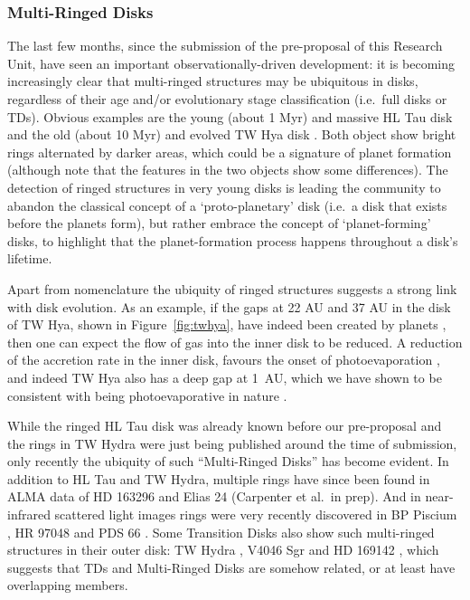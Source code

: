 \documentclass[10pt,fleqn,twoside]{article}
\begin{document}
\subsubsection{Multi-Ringed Disks}
\label{sec-multi-ringed-disks}
The last few months, since the submission of the pre-proposal of this
Research Unit, have seen an important observationally-driven development: it
is becoming increasingly clear that multi-ringed structures may be
ubiquitous in disks, regardless of their age and/or evolutionary stage
classification (i.e.\ full disks or TDs). Obvious examples are the young
(about 1 Myr) and massive HL Tau disk \citep{2015ApJ...808L...3A} and the
old (about 10 Myr) and evolved TW Hya disk \citep{2016ApJ...820L..40A,
  2016arXiv161008939V}. Both object show bright rings alternated by darker
areas, which could be a signature of planet formation (although note that
the features in the two objects show some differences). The detection of
ringed structures in very young disks is leading the community to abandon
the classical concept of a `proto-planetary' disk (i.e.\ a disk that exists
before the planets form), but rather embrace the concept of `planet-forming'
disks, to highlight that the planet-formation process happens throughout a
disk's lifetime.

Apart from nomenclature the ubiquity of ringed structures suggests a strong
link with disk evolution. As an example, if the gaps at 22 AU and 37 AU in
the disk of TW Hya, shown in Figure~\ref{fig:twhya}, have indeed been
created by planets \citep[but see also][]{2016arXiv161008939V}, then one can
expect the flow of gas into the inner disk to be reduced. A reduction of the
accretion rate in the inner disk, favours the onset of photoevaporation
\citep[e.g.][]{2013MNRAS.430.1392R, 2015MNRAS.454.2173R}, and indeed TW Hya
also has a deep gap at 1~AU, which we have shown to be consistent with being
photoevaporative in nature \citep{2017MNRAS.464L..95E}.

While the ringed HL Tau disk was already known before our pre-proposal and
the rings in TW Hydra were just being published around the time of
submission, only recently the ubiquity of such ``Multi-Ringed Disks'' has
become evident. In addition to HL Tau and TW Hydra, multiple rings have
since been found in ALMA data of HD 163296 \citep{Isella2016} and Elias 24
(Carpenter et al.~in prep). And in near-infrared scattered light images
rings were very recently discovered in BP Piscium
\citep{2017MNRAS.466L...7D}, HR 97048 \citep{2016A&A...595A.112G} and PDS 66
\citep{2016ApJ...818L..15W}. Some Transition Disks also show such
multi-ringed structures in their outer disk: TW Hydra
\citep{2016arXiv161008939V}, V4046 Sgr \citep{2015ApJ...803L..10R} and HD
169142 \citep{2015PASJ...67...83M}, which suggests that TDs and Multi-Ringed
Disks are somehow related, or at least have overlapping members.
\end{document}
